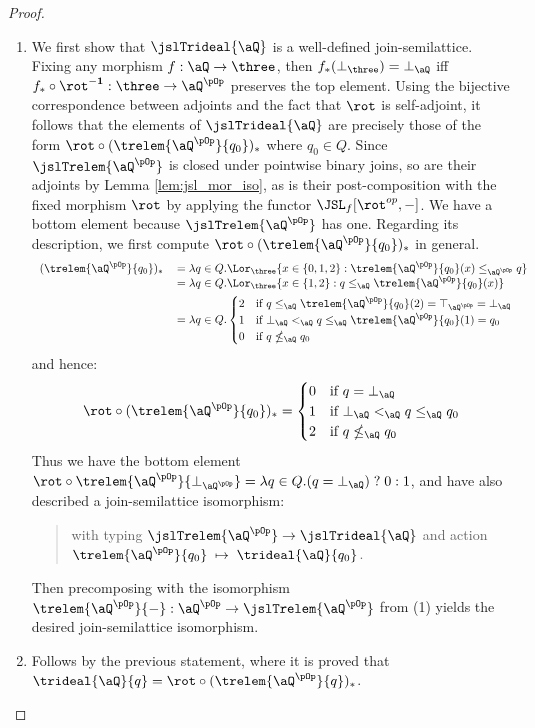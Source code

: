\documentclass{article}
\begin{document}
\begin{proof}
\begin{enumerate}
\item
We first show that $\jslTrideal{\aQ}$ is a well-defined join-semilattice. Fixing any morphism $f : \aQ \to \three$, then $f_*(\bot_\three)  = \bot_\aQ$ iff $f_* \circ \rot^{\bf-1} : \three \to \aQ^{\pOp}$ preserves the top element. Using the bijective correspondence between adjoints and the fact that $\rot$ is self-adjoint, it follows that the elements of $\jslTrideal{\aQ}$ are precisely those of the form $\rot \circ (\trelem{\aQ^{\pOp}}{q_0})_*$ where $q_0 \in Q$. Since $\jslTrelem{\aQ^{\pOp}}$ is closed under pointwise binary joins, so are their adjoints by Lemma \ref{lem:jsl_mor_iso}, as is their post-composition with the fixed morphism $\rot$ by applying the functor $\JSL_f[\rot^{op},-]$. We have a bottom element because $\jslTrelem{\aQ^{\pOp}}$ has one. Regarding its  description, we first compute $\rot \circ (\trelem{\aQ^{\pOp}}{q_0})_*$ in general.
\[
\begin{tabular}{llll}
$(\trelem{\aQ^{\pOp}}{q_0})_*$
&
$= \lambda q \in Q. \Lor_\three \{ x \in \{0,1,2\} : \trelem{\aQ^{\pOp}}{q_0}(x) \leq_{\aQ^{\pOp}} q \}$
\\&
$= \lambda q \in Q. \Lor_\three \{ x \in \{1,2\} : q \leq_\aQ \trelem{\aQ^{\pOp}}{q_0}(x)  \}$
\\[1ex]&
$= \lambda q \in Q.
\begin{cases}
$2$ & \text{if $q \leq_\aQ \trelem{\aQ^{\pOp}}{q_0}(2) = \top_{\aQ^{\pOp}} = \bot_\aQ$}
\\
$1$ & \text{if $\bot_\aQ <_\aQ q \leq_\aQ \trelem{\aQ^{\pOp}}{q_0}(1) = q_0$}
\\
$0$ & \text{if $q \nleq_\aQ q_0$}
\end{cases}$
\end{tabular}
\]
and hence:
\[
\rot \circ (\trelem{\aQ^{\pOp}}{q_0})_* =
\begin{cases}
$0$ & \text{if $q = \bot_\aQ$}
\\
$1$ & \text{if $\bot_\aQ <_\aQ q \leq_\aQ q_0$}
\\
$2$ & \text{if $q \nleq_\aQ q_0$}
\end{cases}
\]
Thus we have the bottom element $\rot \circ \trelem{\aQ^{\pOp}}{\bot_{\aQ^{\pOp}}}
= \lambda q \in Q. (q = \bot_\aQ) \;?\; 0 : 1$, and have also described a join-semilattice isomorphism:
\begin{quote}
with typing $\jslTrelem{\aQ^{\pOp}} \to \jslTrideal{\aQ}$ and action $\trelem{\aQ^{\pOp}}{q_0} \; \mapsto \; \trideal{\aQ}{q_0}$.
\end{quote}
Then precomposing with the isomorphism $\trelem{\aQ^{\pOp}}{-} : \aQ^{\pOp} \to \jslTrelem{\aQ^{\pOp}}$ from (1) yields the desired join-semilattice isomorphism.

\item
Follows by the previous statement, where it is proved that $\trideal{\aQ}{q} = \rot \circ (\trelem{\aQ^{\pOp}}{q})_*$.

\end{enumerate}
\end{proof}
\end{document}
